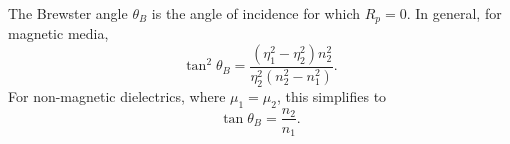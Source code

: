 \documentclass[10pt,a4paper]{article}
\begin{document}
\begin{theorem}
The Brewster angle \(\theta_B\) is the angle of incidence for which
\(R_p=0\). In general, for magnetic media,
\[
\tan^2\theta_B
=
\frac{(\eta_1^2-\eta_2^2)n_2^2}
     {\eta_2^2(n_2^2-n_1^2)}.
\]
For non-magnetic dielectrics, where \(\mu_1=\mu_2\), this simplifies to
\[
\tan\theta_B=\frac{n_2}{n_1}.
\]
\end{theorem}
\end{document}
